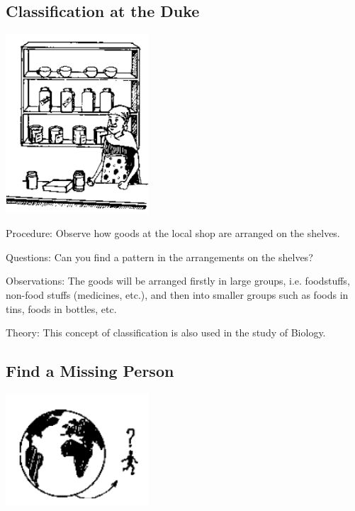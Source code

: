 \begin{multicols}{2}
\subsection{Classification at the Duke} %

\begin{center}
\includegraphics[width=0.4\textwidth]{./img/source/classification-duka.png}
\end{center}

\begin{description*}
\item[Procedure:]{Observe how goods at the local shop are arranged on the shelves.}
\item[Questions:]{Can you find a pattern in the arrangements on the shelves?}
\item[Observations:]{The goods will be arranged firstly in large groups, i.e. foodstuffs, non-food stuffs (medicines,
etc.), and then into smaller groups such as foods in tins, foods in bottles, etc.}
\item[Theory:]{This concept of classification is also used in the study of Biology.}
\end{description*}

\subsection{Find a Missing Person}

\begin{center}
\includegraphics[width=0.4\textwidth]{./img/source/missing-person.png}
\end{center}


\end{multicols}
